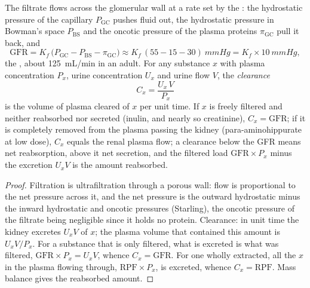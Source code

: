 \begin{theorem}\label{thm:b3:renal-osmoregulation:clearance}
The filtrate flows across the glomerular wall at a rate set by the
\emph{}: the hydrostatic pressure of the capillary
$P_{\text{GC}}$ pushes fluid out, the hydrostatic pressure in Bowman's
space $P_{\text{BS}}$ and the oncotic pressure of the plasma proteins
$\pi_{\text{GC}}$ pull it back, and
\[
\text{GFR} = K_{f}\,\bigl(P_{\text{GC}} - P_{\text{BS}} - \pi_{\text{GC}}\bigr)
\approx K_{f}\,(55 - 15 - 30)\ \unit{mmHg} = K_{f}\times \qty{10}{mmHg},
\]
the \emph{}, about \qty{125}{mL/min} in an
adult. For any substance $x$ with plasma concentration $P_{x}$, urine
concentration $U_{x}$ and urine flow $V$, the \emph{clearance}
\[
C_{x} = \frac{U_{x}\,V}{P_{x}}
\]
is the volume of plasma cleared of $x$ per unit time. If $x$ is freely
filtered and neither reabsorbed nor secreted (inulin, and nearly so
creatinine), $C_{x} = \text{GFR}$; if it is completely removed from the
plasma passing the kidney (para-aminohippurate at low dose), $C_{x}$
equals the renal plasma flow; a clearance below the GFR means net
reabsorption, above it net secretion, and the filtered load $\text{GFR}
\times P_{x}$ minus the excretion $U_{x}V$ is the amount reabsorbed.
\end{theorem}
\begin{proof}
Filtration is ultrafiltration through a porous wall: flow is
proportional to the net pressure across it, and the net pressure is
the outward hydrostatic minus the inward hydrostatic and oncotic
pressures (Starling), the oncotic pressure of the filtrate being
negligible since it holds no protein. Clearance: in unit time the
kidney excretes $U_{x}V$ of $x$; the plasma volume that contained this
amount is $U_{x}V/P_{x}$. For a substance that is only filtered, what
is excreted is what was filtered, $\text{GFR}\times P_{x} = U_{x}V$,
whence $C_{x} = \text{GFR}$. For one wholly extracted, all the $x$ in
the plasma flowing through, $\text{RPF}\times P_{x}$, is excreted,
whence $C_{x} = \text{RPF}$. Mass balance gives the reabsorbed amount.
\end{proof}

